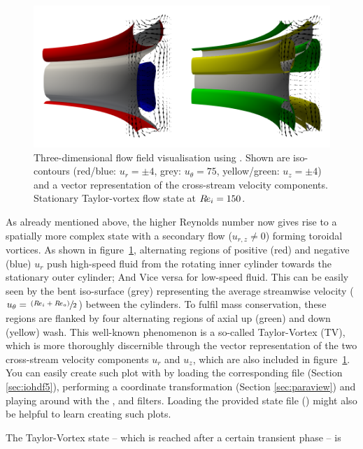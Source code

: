 \documentclass[a4paper, 11pt, DIV=11]{scrartcl}
\begin{document}
\begin{figure}
\includegraphics[width=1.00\textwidth]{figures/tc0041/vectorPlot.png}
\caption{Three-dimensional flow field visualisation using .
Shown are iso-contours (red/blue: $u_{r}=\pm\num{4}$, grey:
$u_{\theta}=\num{75}$, yellow/green: $u_{z}=\pm\num{4}$) and a vector
representation of the cross-stream velocity components. Stationary
Taylor-vortex flow state at $R\hspace{-0.1em}e_{i}=\num{150}$.}
\label{fig:tc0041vectorPlot}
\end{figure}
As already mentioned above, the higher Reynolds number now gives rise
to a spatially more complex state with a secondary flow ($u_{r,z}\neq\num{0}$)
forming toroidal vortices. As shown in figure~\ref{fig:tc0041vectorPlot},
alternating regions of positive (red) and negative (blue) $u_r$ push high-speed
fluid from the rotating inner cylinder towards the stationary outer cylinder;
And Vice versa for low-speed fluid. This can be easily seen by the bent
iso-surface (grey) representing the average streamwise velocity 
($u_{\theta}=\sfrac{\left(R\hspace{-0.1em}e_{i}+R\hspace{-0.1em}e_{o}\right)}{2}$) between the cylinders.
To fulfil mass conservation, these regions are flanked by four alternating regions of
axial up (green) and down (yellow) wash. This well-known phenomenon is a so-called
Taylor-Vortex (TV), which is more thoroughly discernible through the vector representation
of the two cross-stream velocity components $u_{r}$ and $u_{z}$, which are also included
in figure~\ref{fig:tc0041vectorPlot}. You can easily create such plot with 
by loading the corresponding  file (Section \ref{sec:iohdf5}), performing a coordinate
transformation (Section \ref{sec:paraview}) and playing around with the ,
 and  filters. Loading the provided state file () might also be helpful to learn creating such plots.
\par
The Taylor-Vortex state -- which is reached after a certain transient phase -- is
\end{document}
